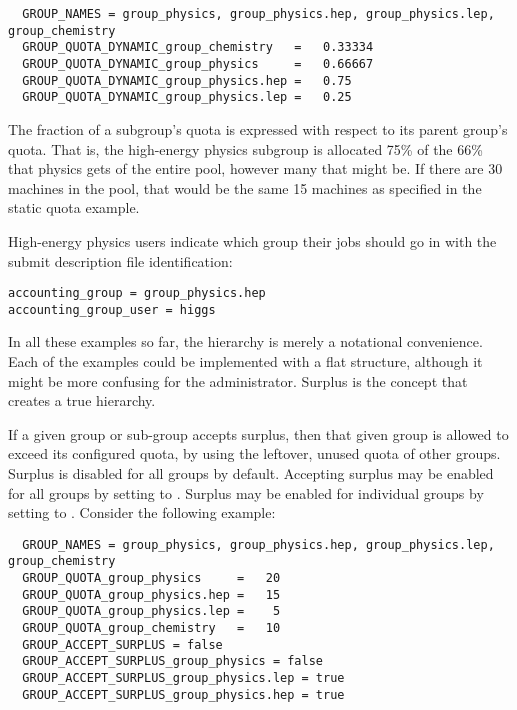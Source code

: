 \footnotesize
\begin{verbatim}
  GROUP_NAMES = group_physics, group_physics.hep, group_physics.lep, group_chemistry
  GROUP_QUOTA_DYNAMIC_group_chemistry   =   0.33334
  GROUP_QUOTA_DYNAMIC_group_physics     =   0.66667
  GROUP_QUOTA_DYNAMIC_group_physics.hep =   0.75
  GROUP_QUOTA_DYNAMIC_group_physics.lep =   0.25
\end{verbatim}
\normalsize

The fraction of a subgroup's quota is expressed with respect to
its parent group's quota.
That is, 
the high-energy physics subgroup is allocated 75\% of the 66\% that 
physics gets of the entire pool, however many that might be.
If there are 30 machines in the pool, that
would be the same 15 machines as specified in the static quota example.

High-energy physics users indicate which group their jobs 
should go in with the submit description file identification:

\begin{verbatim}
accounting_group = group_physics.hep
accounting_group_user = higgs
\end{verbatim}

In all these examples so far,
the hierarchy is merely a notational convenience.
Each of the examples could be implemented with a flat structure, 
although it might be more confusing for the administrator.
Surplus is the concept that creates a true hierarchy.

If a given group or sub-group accepts surplus, 
then that given group is allowed to exceed its configured quota, 
by using the leftover, unused quota of other groups.
Surplus is disabled for all groups by default.  
Accepting surplus may be enabled for all groups by setting
 to .
Surplus may be enabled for individual groups
by setting  to .
Consider the following example:

\footnotesize
\begin{verbatim}
  GROUP_NAMES = group_physics, group_physics.hep, group_physics.lep, group_chemistry
  GROUP_QUOTA_group_physics     =   20
  GROUP_QUOTA_group_physics.hep =   15
  GROUP_QUOTA_group_physics.lep =    5
  GROUP_QUOTA_group_chemistry   =   10
  GROUP_ACCEPT_SURPLUS = false
  GROUP_ACCEPT_SURPLUS_group_physics = false
  GROUP_ACCEPT_SURPLUS_group_physics.lep = true
  GROUP_ACCEPT_SURPLUS_group_physics.hep = true
\end{verbatim}
\normalsize

